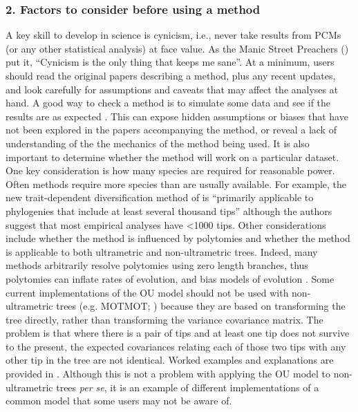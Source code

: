 \documentclass[a4paper,12pt]{article}
\begin{document}
  \subsubsection{2. Factors to consider before using a method}
    A key skill to develop in science is cynicism, i.e., never take results from PCMs (or any other statistical analysis) at face value.
    As the Manic Street Preachers (\citeyear{manics}) put it, ``Cynicism is the only thing that keeps me sane''.
    At a minimum, users should read the original papers describing a method, plus any recent updates, and look carefully for assumptions and caveats that may affect the analyses at hand.
    A good way to check a method is to simulate some data and see if the results are as expected \citep[e.g.][]{boettiger2012your}. 
    This can expose hidden assumptions or biases that have not been explored in the papers accompanying the method, or reveal a lack of understanding of the the mechanics of the method being used. 
    It is also important to determine whether the method will work on a particular dataset.
    One key consideration is how many species are required for reasonable power. 
    Often methods require more species than are usually available. For example, the new trait-dependent diversification method of \citet{rabosky2015robust} is ``primarily applicable to phylogenies that include at least several thousand tips'' although the authors suggest that most empirical analyses have \textless 1000 tips. 
    Other considerations include whether the method is influenced by polytomies and whether the method is applicable to both ultrametric and non-ultrametric trees. 
    Indeed, many methods arbitrarily resolve polytomies using zero length branches, thus polytomies can inflate rates of evolution, and bias models of evolution  \citep{cooper2010body}. 
    Some current implementations of the OU model should not be used with non-ultrametric trees (e.g. MOTMOT; \citealp{Thomas:2011aa}) because they are based on transforming the tree directly, rather than transforming the variance covariance matrix. 
    The problem is that where there is a pair of tips and at least one tip does not survive to the present, the expected covariances relating each of those two tips with any other tip in the tree are not identical. 
    Worked examples and explanations are provided in \citep{slater2014correction}. 
    Although this is not a problem with applying the OU model to non-ultrametric trees \textit{per se}, it is an example of different implementations of a common model that some users may not be aware of. 
\end{document}
